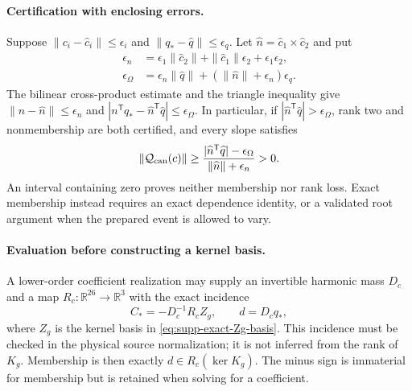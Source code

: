 \documentclass[11pt]{article}
\numberwithin{equation}{section}
\theoremstyle{definition}
\theoremstyle{remark}
\begin{document}
\paragraph{Certification with enclosing errors.}
Suppose $\|c_i-\widehat c_i\|\le\epsilon_i$ and
$\|q_*-\widehat q\|\le\epsilon_q$.  Let
$\widehat n=\widehat c_1\times\widehat c_2$ and put
\begin{equation}
 \begin{split}
 \epsilon_n&=\epsilon_1\|\widehat c_2\|
             +\|\widehat c_1\|\epsilon_2+\epsilon_1\epsilon_2,\\
 \epsilon_\Omega&=\epsilon_n\|\widehat q\|
                    +(\|\widehat n\|+\epsilon_n)\epsilon_q.
 \end{split}
 \label{eq:supp-finite-range-enclosures}
\end{equation}
The bilinear cross-product estimate and the triangle inequality give
$\|n-\widehat n\|\le\epsilon_n$ and
$|n^{\mathsf T}q_*-\widehat n^{\mathsf T}\widehat q|
\le\epsilon_\Omega$.  In particular, if
$|\widehat n^{\mathsf T}\widehat q|>\epsilon_\Omega$, rank two and
nonmembership are both certified, and every slope satisfies
\begin{equation}
 \|\mathcal Q_{\rm can}(c)\|\ge
 \frac{|\widehat n^{\mathsf T}\widehat q|-\epsilon_\Omega}
      {\|\widehat n\|+\epsilon_n}>0.
 \label{eq:supp-finite-range-certified-floor}
\end{equation}
An interval containing zero proves neither membership nor rank loss.  Exact
membership instead requires an exact dependence identity, or a validated
root argument when the prepared event is allowed to vary.

\paragraph{Evaluation before constructing a kernel basis.}
A lower-order coefficient realization may supply an invertible harmonic mass
$D_c$ and a map $R_c:\mathbb R^{26}\to\mathbb R^3$ with the exact incidence
\begin{equation}
 C_*=-D_c^{-1}R_cZ_g,\qquad d=D_cq_*,
 \label{eq:supp-finite-range-incidence}
\end{equation}
where $Z_g$ is the kernel basis in \eqref{eq:supp-exact-Zg-basis}.  This
incidence must be checked in the physical source normalization; it is not
inferred from the rank of $K_g$.  Membership is then exactly
$d\in R_c(\ker K_g)$.  The minus sign is immaterial for membership but is
retained when solving for a coefficient.
\end{document}
